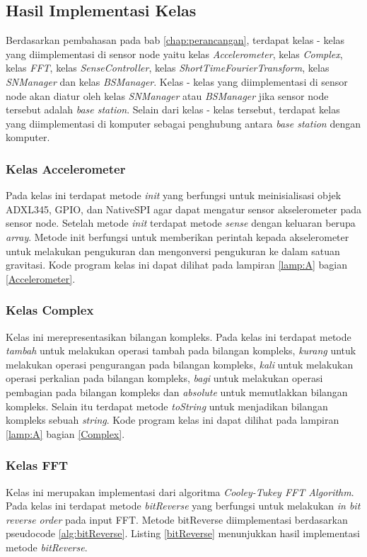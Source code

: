 \subsection{Hasil Implementasi Kelas}
Berdasarkan pembahasan pada bab \ref{chap:perancangan}, terdapat kelas - kelas yang diimplementasi di sensor node yaitu kelas {\it Accelerometer}, kelas {\it Complex}, kelas {\it FFT}, kelas {\it SenseController}, kelas {\it ShortTimeFourierTransform}, kelas {\it SNManager} dan kelas {\it BSManager}. Kelas - kelas yang diimplementasi di sensor node akan diatur oleh kelas {\it SNManager} atau {\it BSManager} jika sensor node tersebut adalah {\it base station}. Selain dari kelas - kelas tersebut, terdapat kelas yang diimplementasi di komputer sebagai penghubung antara 
{\it base station} dengan komputer.

\subsubsection{Kelas Accelerometer}
Pada kelas ini terdapat metode {\it init} yang berfungsi untuk meinisialisasi objek ADXL345, GPIO, dan NativeSPI agar dapat
mengatur sensor akselerometer pada sensor node. Setelah metode {\it init} terdapat metode {\it sense} dengan keluaran berupa {\it array}.
Metode init berfungsi untuk memberikan perintah kepada akselerometer untuk melakukan pengukuran dan mengonversi pengukuran ke dalam satuan 
gravitasi. Kode program kelas ini dapat dilihat pada lampiran \ref{lamp:A} bagian \ref{Accelerometer}. 

\subsubsection{Kelas Complex}
Kelas ini merepresentasikan bilangan kompleks. Pada kelas ini terdapat metode {\it tambah} untuk melakukan operasi tambah pada bilangan kompleks, {\it kurang} untuk melakukan operasi pengurangan pada bilangan kompleks, {\it kali} untuk melakukan operasi perkalian pada bilangan kompleks, {\it bagi} untuk melakukan operasi pembagian pada bilangan kompleks dan {\it absolute} untuk memutlakkan bilangan kompleks. Selain itu terdapat metode {\it toString} untuk menjadikan bilangan kompleks sebuah {\it string}. Kode program kelas ini dapat dilihat pada lampiran \ref{lamp:A} bagian \ref{Complex}.

\subsubsection{Kelas FFT}
Kelas ini merupakan implementasi dari algoritma {\it Cooley-Tukey FFT Algorithm}. Pada kelas ini terdapat metode {\it bitReverse} yang berfungsi untuk melakukan {\it in bit reverse order} pada input FFT. Metode bitReverse diimplementasi berdasarkan pseudocode \ref{alg:bitReverse}. Listing \ref{bitReverse} menunjukkan hasil implementasi metode {\it bitReverse}.

